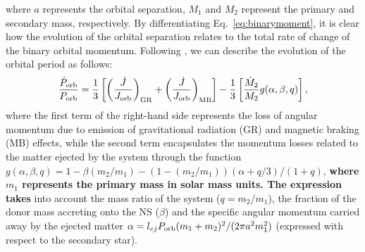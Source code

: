 \documentclass[fleqn,usenatbib]{mnras}
\begin{document}
where $a$ represents the orbital separation, $M_1$ and $M_2$ represent the primary and secondary mass, respectively. By differentiating Eq.~\ref{eq:binarymoment}, it is clear how the evolution of the orbital separation relates to the total rate of change of the binary orbital momentum. Following \citet{di-Salvo:2008uu}, we can describe the evolution of the orbital period as follows:
\begin{equation}
\label{eq:evomom}
\frac{\dot{P}_{\rm orb}}{P_{\rm orb}}=\frac{1}{3}\left[\left( \frac{\dot{J}}{J_{\rm orb}} \right)_{\rm GR}+\left( \frac{\dot{J}}{J_{\rm orb}} \right)_{\rm MB}\right]-\frac{1}{3}\left[\frac{\dot{M}_2}{M_2} g(\alpha,\beta,q)\right],
\end{equation}
where the first term of the right-hand side represents the loss of angular momentum due to emission of gravitational radiation (GR) and magnetic braking (MB) effects, while the second term encapsulates the momentum losses related to the matter ejected by the system through the function $g(\alpha,\beta,q) = 1 - \beta (m_2/m_1) - (1 -(m_2/m_1))(\alpha + q/3)/(1 + q)$, \textbf{where $m_1$ represents the primary mass in solar mass units. The expression takes} into account the mass ratio of the system ($q=m_2/m_1$), the fraction of the donor mass accreting onto the NS ($\beta$) and the specific angular momentum carried away by the ejected matter $\alpha = l_{ej}P_{\rm orb} (m_1 + m_2)^2/(2\pi a^2 m_1^2)$ (expressed with respect to the secondary star).  
\end{document}
